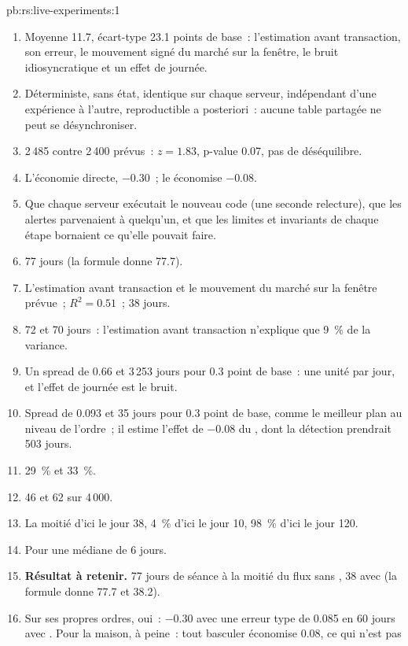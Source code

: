 \begin{solution}{pb:rs:live-experiments:1}
\begin{enumerate}
\item Moyenne 11.7, écart-type 23.1 points de base~: l'estimation avant transaction, son erreur, le mouvement signé du marché sur la fenêtre, le bruit idiosyncratique et un
effet de journée.
\item Déterministe, sans état, identique sur chaque serveur, indépendant d'une expérience à l'autre, reproductible a posteriori~: aucune table partagée ne peut se désynchroniser.
\item 2\,485 contre 2\,400 prévus~: $z = 1.83$, p-value 0.07, pas de déséquilibre.
\item L'économie directe, $-0.30$~; le  économise $-0.08$.
\item Que chaque serveur exécutait le nouveau code (une seconde relecture), que les alertes parvenaient à quelqu'un, et que les limites et invariants de chaque étape bornaient ce qu'elle pouvait faire.
\item 77 jours (la formule donne 77.7).
\item L'estimation avant transaction et le mouvement du marché sur la fenêtre prévue~; $R^2 = 0.51$~; 38 jours.
\item 72 et 70 jours~: l'estimation avant transaction n'explique que 9~\% de la variance.
\item Un spread de 0.66 et 3\,253 jours pour 0.3 point de base~: une unité par jour, et l'effet de journée est le bruit.
\item Spread de 0.093 et 35 jours pour 0.3 point de base, comme le meilleur plan au niveau de l'ordre~; il estime l'effet de $-0.08$ du , dont la détection prendrait 503 jours.
\item 29~\% et 33~\%.
\item 46 et 62 sur 4\,000.
\item La moitié d'ici le jour 38, 4~\% d'ici le jour 10, 98~\% d'ici le jour 120.
\item Pour une médiane de 6 jours.
\item \textbf{Résultat à retenir.} 77 jours de séance à la moitié du flux sans , 38 avec (la formule donne 77.7 et 38.2).
\item Sur ses propres ordres, oui~: $-0.30$ avec une erreur type de 0.085 en 60 jours avec . Pour la maison, à peine~: tout basculer économise 0.08, ce qui n'est pas

\end{enumerate}
\end{solution}
